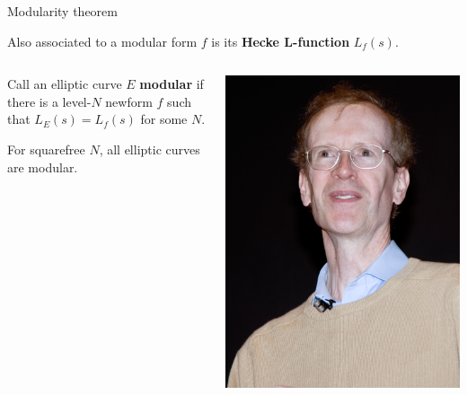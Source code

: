 \documentclass[10pt]{beamer}
\theoremstyle{definition}
\begin{document}
\begin{frame}[t]{Modularity theorem}

Also associated to a modular form $ f $ is its \textbf{Hecke L-function} $ L_f(s) $.

\vspace{0.5cm}

\begin{columns}[T]

\begin{column}{0.8\textwidth}
Call an elliptic curve $ E $ \textbf{modular} if there is a level-$ N $ newform $ f $ such that $ L_E(s) = L_f(s) $ for some $ N $.

\vspace{0.5cm}

\begin{theorem}[Wiles]
For squarefree $ N $, all elliptic curves are modular.
\end{theorem}
\end{column}

\begin{column}{0.1\textwidth}
\hspace{-1cm}
\includegraphics[width=1.5\textwidth]{wiles.jpg}
\end{column}


\end{columns}
\end{frame}
\end{document}
